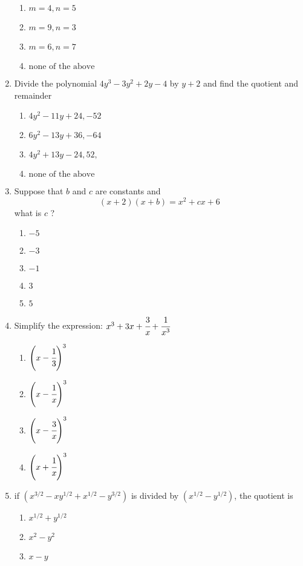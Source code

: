 \begin{multicols}{2}
\begin{enumerate}[label={\arabic*.}]
	\begin{enumerate}[label={\Alph*.}]
	\item \(m = 4, n = 5\)
	\item \(m = 9, n =3\)
	\item \(m = 6, n = 7\)
	\item \( \text{none of the above}\)
	\end{enumerate}
\item Divide the polynomial $4y^3 - 3y^2 + 2y -4 $ by $y + 2$ and find the quotient and remainder 
	\begin{enumerate}[label={\Alph*.}]
	\item \(4y^2 - 11y + 24, -52\)
	\item \(6y^2 - 13y + 36 , -64\)
	\item \(4y^2 + 13y - 24, 52, \)
	\item \(\text{none of the above}\)
	\end{enumerate}
\item Suppose that $b$ and $c$ are constants and $$(x+2)(x+b) = x^2 + cx + 6$$ what is $c$ ?
	\begin{enumerate}[label={\Alph*.}]
	\item \(-5\)
	\item \(-3\)
	\item \(-1\)
	\item \(3\)
	\item \(5\)
	\end{enumerate}
\item Simplify the expression: $x^3 + 3x + \cfrac{3}{x} + \cfrac{1}{x^3}$
\begin{multicols}{2}
	\begin{enumerate}[label={\Alph*.}]
	\item \(\left(x - \cfrac{1}{3}\right)^3\)
	\item \(\left(x - \cfrac{1}{x}\right)^3\)
	\item \(\left(x - \cfrac{3}{x}\right)^3\)
	\item \(\left(x + \cfrac{1}{x}\right)^3\)
	\end{enumerate}
\end{multicols}
\item if $(x^{3/2} - xy^{1/2} + x^{1/2} - y^{3/2})$ is divided by $(x^{1/2} - y^{1/2})$, the quotient is 
\begin{enumerate}[label={\Alph*.}]
	\item \(x^{1/2} + y^{1/2}\)
	\item \(x^2 - y^2\)
	\item \(x-y\)

\end{enumerate}
\end{enumerate}
\end{multicols}
